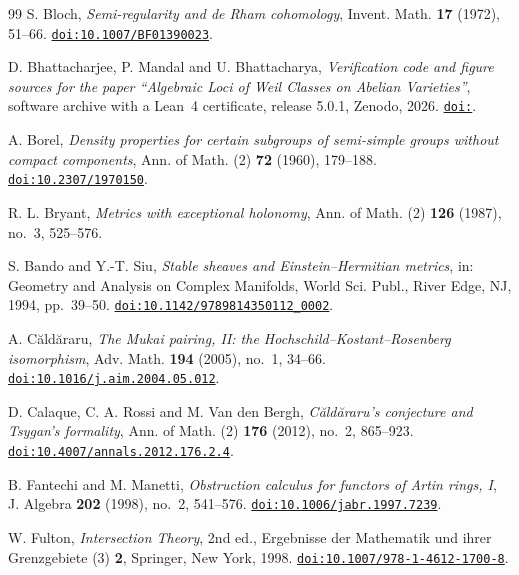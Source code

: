 \begin{thebibliography}{99}
S. Bloch,
\emph{Semi-regularity and de Rham cohomology},
Invent. Math. \textbf{17} (1972), 51--66.
\href{https://doi.org/10.1007/BF01390023}{\texttt{doi:10.1007/BF01390023}}.

D. Bhattacharjee, P. Mandal and U. Bhattacharya,
\emph{Verification code and figure sources for the paper ``Algebraic Loci of
Weil Classes on Abelian Varieties''}, software archive with a Lean~4
certificate, release 5.0.1, Zenodo, 2026.
\href{https://doi.org/\zenodoCodeID}{\texttt{doi:\zenodoCodeID}}.

A. Borel,
\emph{Density properties for certain subgroups of semi-simple groups without
compact components},
Ann. of Math. (2) \textbf{72} (1960), 179--188.
\href{https://doi.org/10.2307/1970150}{\texttt{doi:10.2307/1970150}}.

R. L. Bryant,
\emph{Metrics with exceptional holonomy},
Ann. of Math. (2) \textbf{126} (1987), no.~3, 525--576.

S. Bando and Y.-T. Siu,
\emph{Stable sheaves and Einstein--Hermitian metrics},
in: Geometry and Analysis on Complex Manifolds,
World Sci. Publ., River Edge, NJ, 1994, pp.~39--50.
\href{https://doi.org/10.1142/9789814350112_0002}{\texttt{doi:10.1142/9789814350112\_0002}}.

A. C\u{a}ld\u{a}raru,
\emph{The Mukai pairing, II: the Hochschild--Kostant--Rosenberg isomorphism},
Adv. Math. \textbf{194} (2005), no.~1, 34--66.
\href{https://doi.org/10.1016/j.aim.2004.05.012}{\texttt{doi:10.1016/j.aim.2004.05.012}}.

D. Calaque, C. A. Rossi and M. Van den Bergh,
\emph{C\u{a}ld\u{a}raru's conjecture and Tsygan's formality},
Ann. of Math. (2) \textbf{176} (2012), no.~2, 865--923.
\href{https://doi.org/10.4007/annals.2012.176.2.4}{\texttt{doi:10.4007/annals.2012.176.2.4}}.

B. Fantechi and M. Manetti,
\emph{Obstruction calculus for functors of Artin rings, I},
J. Algebra \textbf{202} (1998), no.~2, 541--576.
\href{https://doi.org/10.1006/jabr.1997.7239}{\texttt{doi:10.1006/jabr.1997.7239}}.

W. Fulton,
\emph{Intersection Theory}, 2nd ed.,
Ergebnisse der Mathematik und ihrer Grenzgebiete (3) \textbf{2},
Springer, New York, 1998.
\href{https://doi.org/10.1007/978-1-4612-1700-8}{\texttt{doi:10.1007/978-1-4612-1700-8}}.


\end{thebibliography}
